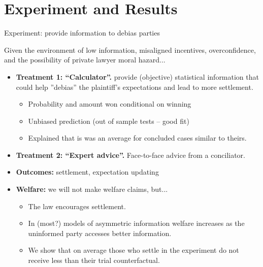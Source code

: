 \documentclass[9pt]{beamer}
\begin{document}
\section{Experiment and Results}

\begin{frame}{Experiment: provide information to debias parties}

    Given the environment of low information, misaligned incentives, overconfidence, and the possibility of private lawyer moral hazard...
        \vspace{0.1in}
        
    \begin{itemize}
        \item \textbf{Treatment 1: ``Calculator''.} provide (objective) statistical information that could help ''debias'' the plaintiff's expectations and lead to more settlement.
          \begin{itemize}
              \item Probability and amount won conditional on winning
              \item Unbiased prediction (out of sample tests -- good fit)
              \item Explained that is was an average for concluded cases similar to theirs.
          \end{itemize}
        \vspace{0.1in}
        \item \textbf{Treatment 2: ``Expert advice''.} Face-to-face advice from a conciliator.
        \vspace{0.1in}
        \item{\textbf{Outcomes:} settlement, \alert{expectation updating}}
         \vspace{0.1in}
        \item \textbf{Welfare:} we will not make welfare claims, but...
            \begin{itemize}
                \item The law encourages settlement.
                \item In (most?) models of asymmetric information welfare increases as the uninformed party accesses better information.
                \item We show that on average those who settle in the experiment do not receive less than their trial counterfactual.
            \end{itemize}
    \end{itemize}
\end{frame}
\end{document}
